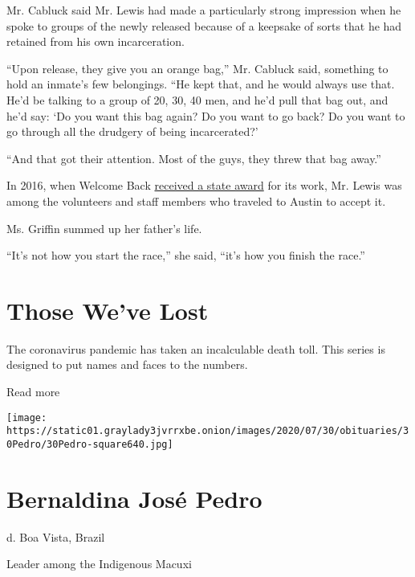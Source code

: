 Mr. Cabluck said Mr. Lewis had made a particularly strong impression
when he spoke to groups of the newly released because of a keepsake of
sorts that he had retained from his own incarceration.

``Upon release, they give you an orange bag,'' Mr. Cabluck said,
something to hold an inmate's few belongings. ``He kept that, and he
would always use that. He'd be talking to a group of 20, 30, 40 men, and
he'd pull that bag out, and he'd say: `Do you want this bag again? Do
you want to go back? Do you want to go through all the drudgery of being
incarcerated?'

``And that got their attention. Most of the guys, they threw that bag
away.''

In 2016, when Welcome Back
\href{https://www.tdcj.texas.gov/news/2016_vol_gov_awards/welcome_back_tarrant_county.html}{received
a state award} for its work, Mr. Lewis was among the volunteers and
staff members who traveled to Austin to accept it.

Ms. Griffin summed up her father's life.

``It's not how you start the race,'' she said, ``it's how you finish the
race.''

\href{https://www.nytimes3xbfgragh.onion/interactive/2020/obituaries/people-died-coronavirus-obituaries.html?action=click\&pgtype=Article\&state=default\&region=BELOW_MAIN_CONTENT\&context=covid_obits_promo}{}

\hypertarget{those-weve-lost}{%
\section{Those We've Lost}\label{those-weve-lost}}

The coronavirus pandemic has taken an incalculable death toll. This
series is designed to put names and faces to the numbers.

Read more

\texttt{[image: https://static01.graylady3jvrrxbe.onion/images/2020/07/30/obituaries/30Pedro/30Pedro-square640.jpg]}

\hypertarget{bernaldina-josuxe9-pedro}{%
\section{Bernaldina José Pedro}\label{bernaldina-josuxe9-pedro}}

d. Boa Vista, Brazil

Leader among the Indigenous Macuxi

